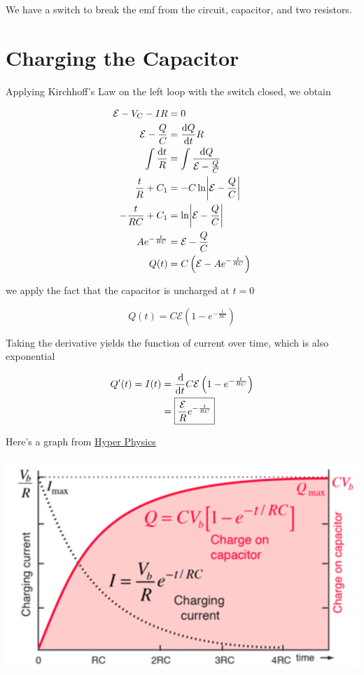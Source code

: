 We have a switch to break the emf from the circuit, capacitor, and two resistors. 

\section{Charging the Capacitor}

Applying Kirchhoff's Law on the left loop with the switch closed, we obtain 

\begin{align*}
    \mathcal{E} - V_C - IR &= 0\\
    \mathcal{E} - \frac{Q}{C} &= \frac{\dif Q}{\dif t} R\\
    \int \frac{\dif t}{R} &= \int \frac{\dif Q}{\mathcal{E} - \frac{Q}{C}}\\
    \frac{t}{R} + C_1 &= -C \ln\abs{\mathcal{E} - \frac{Q}{C}}\\
    -\frac{t}{RC} + C_1 &= \ln\abs{\mathcal{E} - \frac{Q}{C}}\\
    Ae^{-\frac{t}{RC}} &= \mathcal{E} - \frac{Q}{C}\\
    Q(t) &= C \left(\mathcal{E} - Ae^{-\frac{t}{RC}}\right)
\end{align*}

we apply the fact that the capacitor is uncharged at $t = 0$

\[\boxed{Q(t) = C \mathcal{E} \left(1 - e^{-\frac{t}{RC}}\right)}\]

Taking the derivative yields the function of current over time, which is also exponential

\begin{align*}
    Q'(t) = I(t) &= \frac{\dif}{\dif t} C \mathcal{E} \left(1 - e^{-\frac{t}{RC}}\right)\\
    &= \boxed{\frac{\mathcal{E}}{R} e^{-\frac{t}{RC}}}
\end{align*}

Here's a graph from \href{http://hyperphysics.phy-astr.gsu.edu/hbase/hph.html}{Hyper Physics}

\begin{center}
    \includegraphics[scale=0.6]{assets/hp-c-charging.png}
\end{center}

